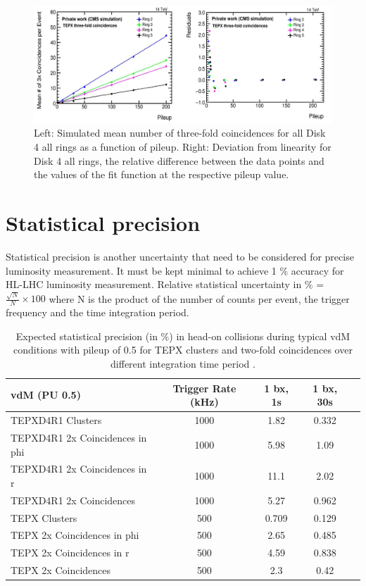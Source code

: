 \begin{figure}[H]
  \centering
  \includegraphics[width=1\columnwidth]{ashish_thesis/TEPX_threefold_linearity.png}
  \caption[Disk 4 all rings Three-Fold Coincidences Linearity]{Left: Simulated mean number of three-fold coincidences for all Disk 4 all rings as a function
    of pileup. Right: Deviation from linearity for Disk 4 all rings, the relative difference between the data points and the values of the fit function at the respective pileup value.}
  \label{fig:tepx_3foldcoin_allPU_3}
\end{figure}

\newpage
\section{Statistical precision}

Statistical precision is another uncertainty that need to be considered for precise luminosity measurement. It must be kept minimal to achieve 1 $\%$ accuracy for HL-LHC luminosity measurement. Relative statistical uncertainty in $\%$ = $\frac{\sqrt{N}}{N} \times 100$ where N is the product of the number of counts per event, the trigger frequency and the time integration period.\\

\begin{table}[htbp]
  \centering
  \caption[Expected stat. precision of TEPX under low pileup] {Expected statistical precision (in $\%$) in head-on collisions during typical vdM conditions with pileup of 0.5 for TEPX clusters and two-fold coincidences over different integration time period \cite{Collaboration:275907420}.}
\begin{tabular}{lcccc}
vdM (PU 0.5) & Trigger Rate (kHz) & 1 bx, 1s & 1 bx, 30s\\
\hline
TEPXD4R1 Clusters&1000&1.82&0.332\\
TEPXD4R1 2x Coincidences in phi &1000&5.98&1.09\\
TEPXD4R1 2x Coincidences in r &1000&11.1&2.02\\
TEPXD4R1 2x Coincidences &1000&5.27&0.962\\
TEPX Clusters&500&0.709&0.129\\
TEPX 2x Coincidences in phi &500&2.65&0.485\\
TEPX 2x Coincidences in r &500&4.59&0.838\\
TEPX 2x Coincidences &500&2.3&0.42\\
\end{tabular}
\end{table}


